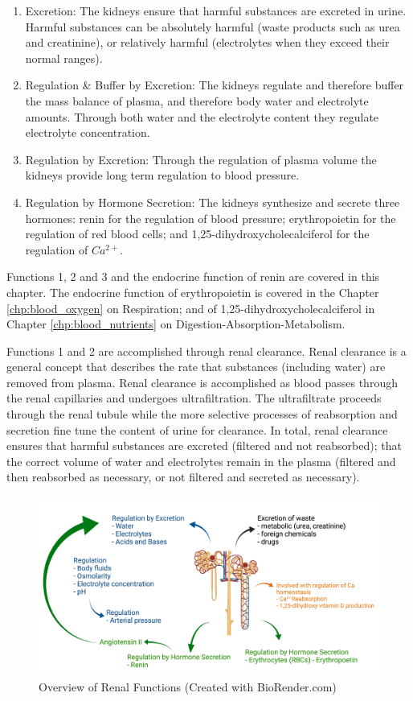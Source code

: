 \begin{enumerate}
    \item Excretion: The kidneys ensure that harmful substances are excreted in urine. Harmful substances can be absolutely harmful (waste products such as urea and creatinine), or relatively harmful (electrolytes when they exceed their normal ranges).
    \item Regulation \& Buffer by Excretion: The kidneys regulate and therefore buffer the mass balance of plasma, and therefore body water and electrolyte amounts. Through both water and the electrolyte content they regulate electrolyte concentration.
    \item Regulation by Excretion: Through the regulation of plasma volume the kidneys provide long term regulation to blood pressure.
    \item Regulation by Hormone Secretion: The kidneys synthesize and secrete three hormones: renin for the regulation of blood pressure; erythropoietin for the regulation of red blood cells; and 1,25-dihydroxycholecalciferol for the regulation of $Ca^{2+}$.
\end{enumerate}

Functions 1, 2 and 3 and the endocrine function of renin are covered in this chapter. The endocrine function of erythropoietin is covered in the Chapter \ref{chp:blood_oxygen} on Respiration; and of 1,25-dihydroxycholecalciferol in Chapter \ref{chp:blood_nutrients} on Digestion-Absorption-Metabolism.

Functions 1 and 2 are accomplished through renal clearance. Renal clearance is a general concept that describes the rate that substances (including water) are removed from plasma. Renal clearance is accomplished as blood passes through the renal capillaries and undergoes ultrafiltration. The ultrafiltrate proceeds through the renal tubule while the more selective processes of reabsorption and secretion fine tune the content of urine for clearance. In total, renal clearance ensures that harmful substances are excreted (filtered and not reabsorbed); that the correct volume of water and electrolytes remain in the plasma (filtered and then reabsorbed as necessary, or not filtered and secreted as necessary). 

\begin{figure}[!h]
    \centering
    \includegraphics[width=1.0\linewidth]{./figure/Renal_Functions.png}
    \caption{Overview of Renal Functions \footnotesize{(Created with BioRender.com)}}
    \label{fig:Renal_Functions}
\end{figure}

